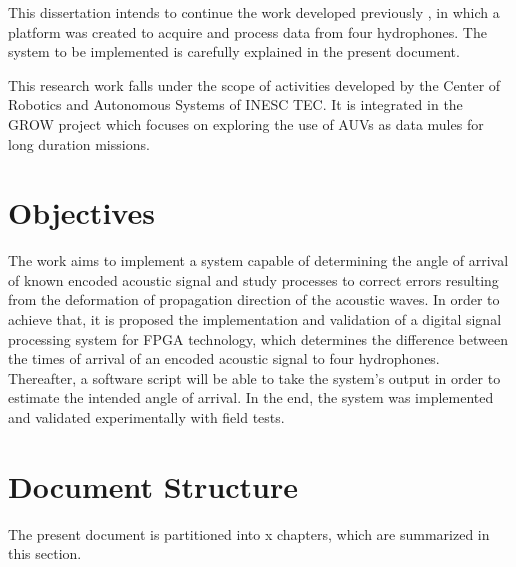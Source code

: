 
This dissertation intends to continue the work developed previously \cite{afonso-thesis}, in which a platform was created to acquire and process data from four hydrophones. The system to be implemented is carefully explained in the present document.
 

This research work falls under the scope of activities developed by the Center of Robotics and Autonomous Systems of INESC TEC. It is integrated in the GROW project which focuses on exploring the use of AUVs as data mules for long duration missions.


\section{Objectives} \label{sec:objective}

The work aims to implement a system capable of determining the angle of arrival of known encoded acoustic signal and study processes to correct errors resulting from the deformation of propagation direction of the acoustic waves. In order to achieve that, it is proposed the implementation and validation of a digital signal processing system for FPGA technology, which determines the difference between the times of arrival of an encoded acoustic signal to four hydrophones. Thereafter, a software script will be able to take the system's output in order to estimate the intended angle of arrival. In the end, the system was implemented and validated experimentally with field tests.

\section{Document Structure}

The present document is partitioned into x chapters, which are summarized in this section.

